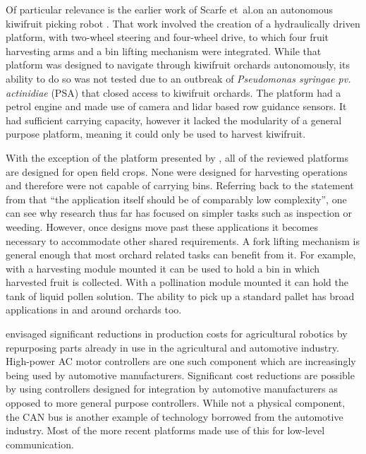 \documentclass[preprint,authoryear,12pt]{elsarticle}
\begin{document}
        Of particular relevance is the earlier work of Scarfe et~al.\@ on an autonomous kiwifruit picking robot \citep{scarfe2009, Scarfe2012}.
        That work involved the creation of a hydraulically driven platform, with two-wheel steering and four-wheel drive, to which four fruit harvesting arms and a bin lifting mechanism were integrated.
        While that platform was designed to navigate through kiwifruit orchards autonomously, its ability to do so was not tested due to an outbreak of \textit{Pseudomonas syringae pv. actinidiae} (PSA) that closed access to kiwifruit orchards.
        The platform had a petrol engine and made use of camera and lidar based row guidance sensors.
        It had sufficient carrying capacity, however it lacked the modularity of a general purpose platform, meaning it could only be used to harvest kiwifruit.

        With the exception of the platform presented by \cite{Scarfe2012}, all of the reviewed platforms are designed for open field crops.
        None were designed for harvesting operations and therefore were not capable of carrying bins.
        Referring back to the statement from \cite{Ruckelshausen2009} that ``the application itself should be of comparably low complexity'', one can see why research thus far has focused on simpler tasks such as inspection or weeding.
        However, once designs move past these applications it becomes necessary to accommodate other shared requirements.
        A fork lifting mechanism is general enough that most orchard related tasks can benefit from it.
        For example, with a harvesting module mounted it can be used to hold a bin in which harvested fruit is collected.
        With a pollination module mounted it can hold the tank of liquid pollen solution.
        The ability to pick up a standard pallet has broad applications in and around orchards too.

        \cite{Blackmore2007} envisaged significant reductions in production costs for agricultural robotics by repurposing parts already in use in the agricultural and automotive industry.
        High-power AC motor controllers are one such component which are increasingly being used by automotive manufacturers.
        Significant cost reductions are possible by using controllers designed for integration by automotive manufacturers as opposed to more general purpose controllers.
        While not a physical component, the CAN bus is another example of technology borrowed from the automotive industry.
        Most of the more recent platforms made use of this for low-level communication.
\end{document}
